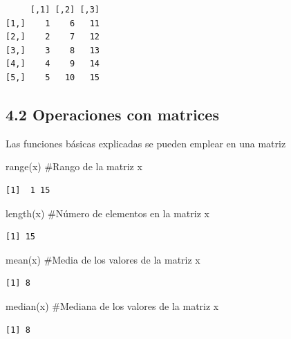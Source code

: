 \documentclass[
  letterpaper,
]{scrbook}
\newenvironment{Shaded}{\begin{snugshade}}{\end{snugshade}}
\newcommand{\CommentTok}[1]{\textcolor[rgb]{0.37,0.37,0.37}{#1}}
\newcommand{\FunctionTok}[1]{\textcolor[rgb]{0.28,0.35,0.67}{#1}}
\newcommand{\NormalTok}[1]{\textcolor[rgb]{0.00,0.23,0.31}{#1}}
\begin{document}
\begin{verbatim}
     [,1] [,2] [,3]
[1,]    1    6   11
[2,]    2    7   12
[3,]    3    8   13
[4,]    4    9   14
[5,]    5   10   15
\end{verbatim}

\hypertarget{operaciones-con-matrices}{%
\subsection{4.2 Operaciones con
matrices}\label{operaciones-con-matrices}}

Las funciones básicas explicadas se pueden emplear en una matriz

\begin{Shaded}
\begin{Highlighting}[]
\FunctionTok{range}\NormalTok{(x) }\CommentTok{\#Rango de la matriz x}
\end{Highlighting}
\end{Shaded}

\begin{verbatim}
[1]  1 15
\end{verbatim}

\begin{Shaded}
\begin{Highlighting}[]
\FunctionTok{length}\NormalTok{(x) }\CommentTok{\#Número de elementos en la matriz x}
\end{Highlighting}
\end{Shaded}

\begin{verbatim}
[1] 15
\end{verbatim}

\begin{Shaded}
\begin{Highlighting}[]
\FunctionTok{mean}\NormalTok{(x) }\CommentTok{\#Media de los valores de la matriz x}
\end{Highlighting}
\end{Shaded}

\begin{verbatim}
[1] 8
\end{verbatim}

\begin{Shaded}
\begin{Highlighting}[]
\FunctionTok{median}\NormalTok{(x) }\CommentTok{\#Mediana de los valores de la matriz x}
\end{Highlighting}
\end{Shaded}

\begin{verbatim}
[1] 8
\end{verbatim}
\end{document}
